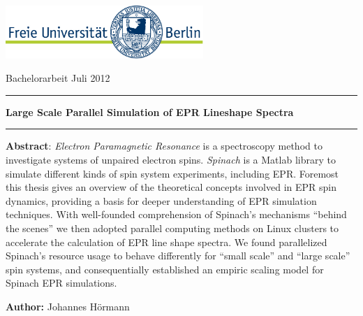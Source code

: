\documentclass[11.5pt,a4paper]{article}
\begin{document}
\setlength{\parindent}{0pt} %


\thispagestyle{empty}

\includegraphics[height=2cm]{FULogo.jpg}
\hfill %
\parbox[b]{0.5\textwidth}{{\large Bachelorarbeit Juli 2012\\}}

\vspace{2cm}

\begin{center}

\rule[11pt]{15cm}{0.5pt}

{ \textbf {\Large Large Scale Parallel Simulation of EPR Lineshape Spectra}}

\rule{15cm}{0.5pt}

\vspace{1cm}

\parbox{15cm}{\small
\textbf{Abstract}: \emph{Electron Paramagnetic Resonance} is a spectroscopy method to investigate systems of unpaired electron spins. \emph{Spinach} is a Matlab library to simulate different kinds of spin system experiments, including EPR. Foremost this thesis gives an overview of the theoretical concepts involved in EPR spin dynamics, providing a basis for deeper understanding of EPR simulation techniques. With well-founded comprehension of Spinach's mechanisms ``behind the scenes''  we then adopted parallel computing methods on Linux clusters to accelerate the calculation of EPR line shape spectra. We found parallelized Spinach's resource usage to behave differently for ``small scale'' and ``large scale'' spin systems, and consequentially established an empiric scaling model for Spinach EPR simulations.}

\vspace{0.5cm}

\end{center}

\vspace{1cm}

\large{

{\bf Author:}  Johannes H\"ormann}
\vspace{0.3cm}
\end{document}
